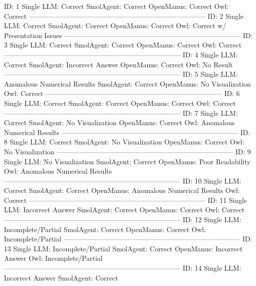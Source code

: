 
\begin{tcolorbox}[colback=cadmiumgreen!5!white,colframe=forestgreen!75!white,breakable,title=\textit{Human evaluation results in task 4.}]
\begin{VerbatimWrap}
ID: 1 
Single LLM: Correct 
SmolAgent: Correct 
OpenManus: Correct 
Owl: Correct 
-----------------------------------------------------------------------------
ID: 2 
Single LLM: Correct 
SmolAgent: Correct 
OpenManus: Correct 
Owl: Correct w/ Presentation Issues 
-----------------------------------------------------------------------------
ID: 3 
Single LLM: Correct 
SmolAgent: Correct 
OpenManus: Correct 
Owl: Correct 
-----------------------------------------------------------------------------
ID: 4 
Single LLM: Correct 
SmolAgent: Incorrect Answer 
OpenManus: Correct 
Owl: No Result 
-----------------------------------------------------------------------------
ID: 5 
Single LLM: Anomalous Numerical Results 
SmolAgent: Correct 
OpenManus: No Visualization 
Owl: Correct 
-----------------------------------------------------------------------------
ID: 6 
Single LLM: Correct 
SmolAgent: Correct 
OpenManus: Correct 
Owl: Correct 
-----------------------------------------------------------------------------
ID: 7 
Single LLM: Correct 
SmolAgent: No Visualization 
OpenManus: Correct 
Owl: Anomalous Numerical Results 
-----------------------------------------------------------------------------
ID: 8 
Single LLM: Correct 
SmolAgent: No Visualization 
OpenManus: Correct 
Owl: No Visualization 
-----------------------------------------------------------------------------
ID: 9 
Single LLM: No Visualization 
SmolAgent: Correct 
OpenManus: Poor Readability 
Owl: Anomalous Numerical Results 
-----------------------------------------------------------------------------
ID: 10 
Single LLM: Correct 
SmolAgent: Correct 
OpenManus: Anomalous Numerical Results 
Owl: Correct 
-----------------------------------------------------------------------------
ID: 11 
Single LLM: Incorrect Answer 
SmolAgent: Correct 
OpenManus: Correct 
Owl: Correct 
-----------------------------------------------------------------------------
ID: 12 
Single LLM: Incomplete/Partial 
SmolAgent: Correct 
OpenManus: Correct 
Owl: Incomplete/Partial 
-----------------------------------------------------------------------------
ID: 13 
Single LLM: Incomplete/Partial 
SmolAgent: Correct 
OpenManus: Incorrect Answer 
Owl: Incomplete/Partial 
-----------------------------------------------------------------------------
ID: 14 
Single LLM: Incorrect Answer 
SmolAgent: Correct 

\end{VerbatimWrap}
\end{tcolorbox}
